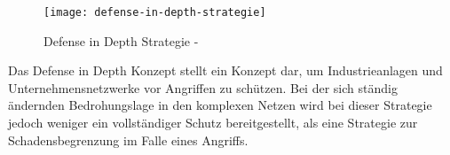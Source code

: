 \begin{figure}[h]
    \centering
    \texttt{[image: defense-in-depth-strategie]}
    \caption{Defense in Depth Strategie - \cite{kuipers2006}}
    \label{Kap3:Defense-in-Depth}
\end{figure}

\clearpage

Das Defense in Depth Konzept stellt ein Konzept dar, um Industrieanlagen und Unternehmensnetzwerke vor Angriffen zu schützen. Bei der sich ständig ändernden Bedrohungslage in den komplexen Netzen wird bei dieser Strategie jedoch weniger ein vollständiger Schutz bereitgestellt, als eine Strategie zur Schadensbegrenzung im Falle eines Angriffs.